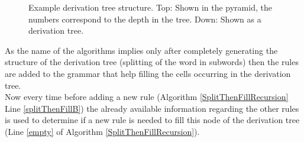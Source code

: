 \begin{figure} [h]
\begin{minipage}{6in}
{
		}
	\end{minipage}
		\label{treeStruct}
		\caption{Example derivation tree structure. Top: Shown in the pyramid, the numbers correspond to the depth in the tree. Down: Shown as a derivation tree.}
\end{figure}

\noindent As the name of the algorithms implies only after completely generating the structure of the derivation tree (splitting of the word in subwords) then the rules are added to the grammar that help filling the cells occurring in the derivation tree.\\
Now every time before adding a new rule (Algorithm \ref{SplitThenFillRecursion} Line \ref{splitThenFillB}) the already available information regarding the other rules is used to determine if a new rule is needed to fill this node of the derivation tree (Line \ref{empty} of Algorithm \ref{SplitThenFillRecursion}).\\


